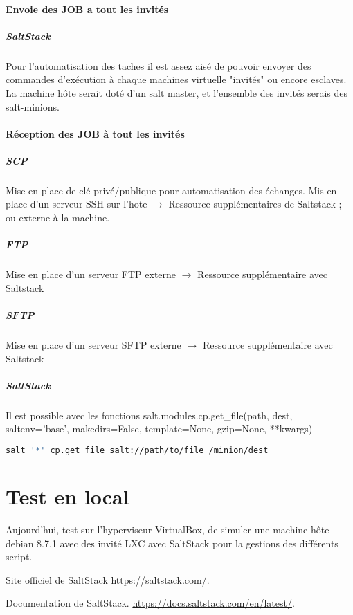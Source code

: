 \documentclass[french]{article}
\begin{document}
\paragraph{Envoie des JOB a tout les invités}  
\subparagraph{SaltStack}
Pour l'automatisation des taches il est assez aisé de pouvoir envoyer des commandes d’exécution à chaque machines virtuelle "invités" ou encore esclaves. La machine hôte serait doté d'un salt master, et l'ensemble des invités serais des salt-minions. 
 
\paragraph{Réception des JOB à tout les invités}  
\subparagraph{SCP}
Mise en place de clé privé/publique pour automatisation des échanges. Mis en place d'un serveur SSH sur l'hote $\rightarrow$ Ressource supplémentaires de Saltstack ; ou externe à la machine.
\subparagraph{FTP}
Mise en place d'un serveur FTP externe $\rightarrow$ Ressource supplémentaire avec Saltstack 
\subparagraph{SFTP}
Mise en place d'un serveur SFTP externe $\rightarrow$ Ressource supplémentaire avec Saltstack 
\subparagraph{SaltStack}

Il est possible avec les fonctions 
salt.modules.cp.get\_file(path, dest, saltenv='base', makedirs=False, template=None, gzip=None, **kwargs)
\begin{lstlisting}[language=bash,caption={Salt copy },frame=single]
salt '*' cp.get_file salt://path/to/file /minion/dest
\end{lstlisting}

\section{Test en local}

Aujourd'hui, test sur l'hyperviseur VirtualBox, de simuler une machine hôte debian 8.7.1 avec des invité LXC avec SaltStack pour la gestions des différents script.
\newpage
\begin{thebibliography}{9}

        Site officiel de SaltStack
          \url{https://saltstack.com/}.

         Documentation de SaltStack.
          \url{https://docs.saltstack.com/en/latest/}.
\end{thebibliography}
\end{document}
